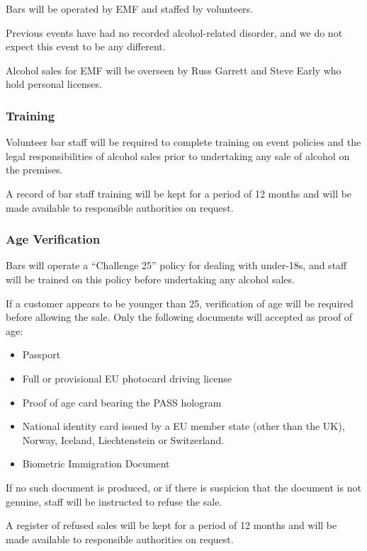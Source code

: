 Bars will be operated by EMF and staffed by volunteers.

Previous events have had no recorded alcohol-related disorder, and we do not
expect this event to be any different.

Alcohol sales for EMF will be overseen by Russ Garrett and Steve Early who
hold personal licenses.

\subsubsection{Training}

Volunteer bar staff will be required to complete training on event policies
and the legal responsibilities of alcohol sales prior to undertaking any sale
of alcohol on the premises. 

A record of bar staff training will be kept for a period of 12 months and
will be made available to responsible authorities on request.

\subsubsection{Age Verification}

Bars will operate a ``Challenge 25'' policy for dealing with under-18s, and staff
will be trained on this policy before undertaking any alcohol sales.

If a customer appears to be younger than 25, verification of age will be required
before allowing the sale. Only the following documents will accepted as proof of age:

\begin{itemize}
\tightlist
\item Passport
\item Full or provisional EU photocard driving license
\item Proof of age card bearing the PASS hologram
\item National identity card issued by a EU member state (other than the UK), Norway, 
    Iceland, Liechtenstein or Switzerland.
\item Biometric Immigration Document
\end{itemize}

If no such document is produced, or if there is suspicion that the document
is not genuine, staff will be instructed to refuse the sale.

A register of refused sales will be kept for a period of 12 months and will
be made available to responsible authorities on request.

